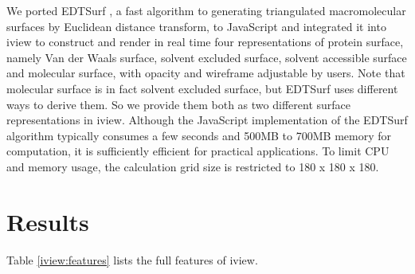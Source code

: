 We ported EDTSurf \citep{1297,1350}, a fast algorithm to generating triangulated macromolecular surfaces by Euclidean distance transform, to JavaScript and integrated it into iview to construct and render in real time four representations of protein surface, namely Van der Waals surface, solvent excluded surface, solvent accessible surface and molecular surface, with opacity and wireframe adjustable by users. Note that molecular surface is in fact solvent excluded surface, but EDTSurf uses different ways to derive them. So we provide them both as two different surface representations in iview. Although the JavaScript implementation of the EDTSurf algorithm typically consumes a few seconds and 500MB to 700MB memory for computation, it is sufficiently efficient for practical applications. To limit CPU and memory usage, the calculation grid size is restricted to 180 x 180 x 180.

\section{Results}

Table \ref{iview:features} lists the full features of iview.


